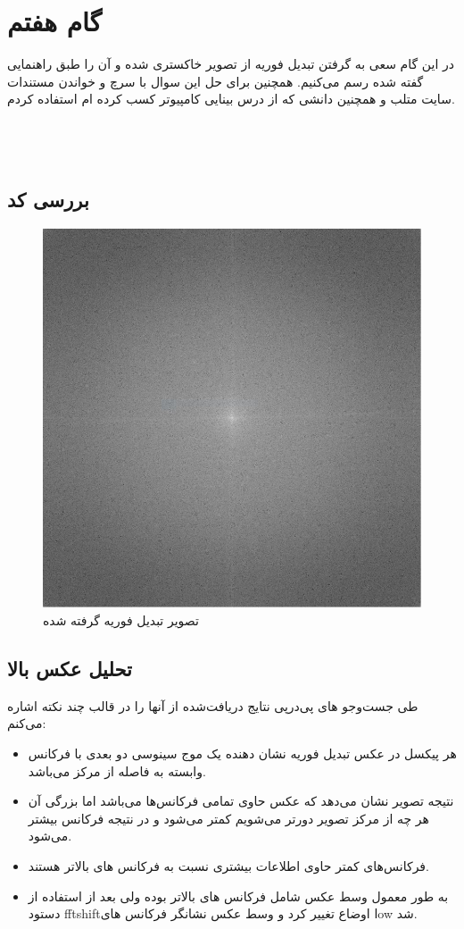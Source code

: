 

\section{گام هفتم}
در این گام سعی به گرفتن تبدیل فوریه از تصویر خاکستری شده و آن را طبق راهنمایی گفته شده رسم می‌کنیم.
همچنین برای حل این سوال با سرچ و خواندن مستندات سایت متلب و همچنین دانشی که از درس بینایی کامپیوتر کسب کرده ام استفاده کردم.
\\
\\
\\
\\
\subsection{بررسی کد}
\lr{}

\begin{figure}[H]
    \centering
    \includegraphics[width=0.65\linewidth]{images/fourierImage.jpg}
    \caption{ تصویر تبدیل فوریه گرفته شده }
    \label{fig:h}
\end{figure}

\subsection{تحلیل عکس بالا}
طی جست‌وجو های پی‌در‌پی نتایج دریافت‌شده از آنها را در قالب چند نکته اشاره می‌کنم:

\begin{itemize}
    \item هر پیکسل در عکس تبدیل فوریه نشان دهنده 
    یک موج سینوسی دو بعدی با فرکانس وابسته به فاصله از مرکز می‌باشد.
    \item نتیجه تصویر نشان می‌دهد که عکس حاوی تمامی فرکانس‌ها می‌باشد اما بزرگی آن هر چه از مرکز تصویر دورتر می‌شویم کمتر می‌شود و در نتیجه فرکانس بیشتر می‌شود.
    \item 
    فرکانس‌های کمتر حاوی اطلاعات بیشتری نسبت به فرکانس های بالاتر هستند.
    \item به طور معمول وسط عکس شامل فرکانس های
    بالاتر بوده ولی بعد از استفاده از دستود  fftshiftاوضاع تغییر کرد و وسط عکس نشانگر فرکانس های ⅼow
    شد.
\end{itemize}

